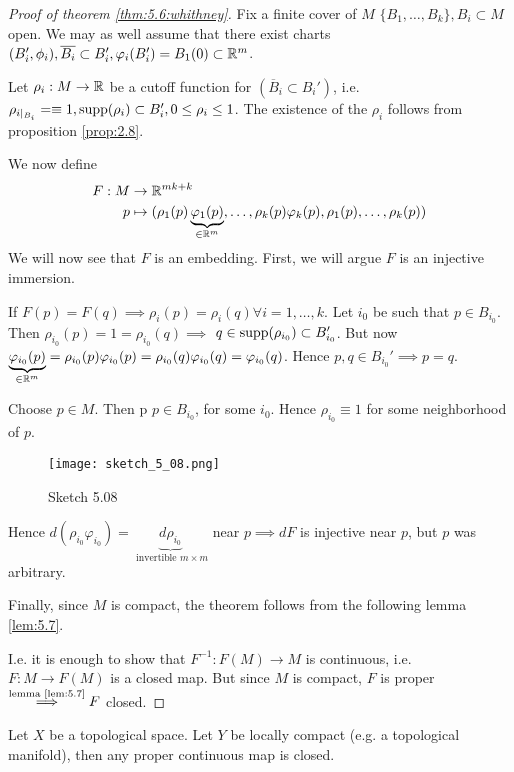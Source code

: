 \begin{proof}[Proof of theorem \ref{thm:5.6:whithney}]
    Fix a finite cover of \(M\) \(\{B_1,\dots,B_k\},B_i\subset M\) open. We may as well assume 
    that there exist charts \((B_i',\phi_i),\overline{B_i}\subset B_i',\varphi_i(B_i')=B_1(0)\subset \mathbb{R}^m\).

    Let \(\rho_i:M\to \mathbb{R}\) be a cutoff function for \((\overline{B}_i\subset B_i')\), i.e. \(\rho_{i\mid_{B_i}}=\equiv 1,\text{supp} (\rho_i)\subset B_i',0\leq \rho_i\leq 1\).
    The existence of the \(\rho_i\) follows from proposition \ref{prop:2.8}. 

    We now define 
    \begin{align*}
        F:M&\to \mathbb{R}^{mk+k}\\
        p&\mapsto (\rho_1(p)\underbrace{\varphi_1(p)}_{\in \mathbb{R}^m},\dots,\rho_k(p)\varphi_k(p),\rho_1(p),\dots,\rho_k(p))
    \end{align*}
    We will now see that \(F\) is an embedding. First, we will argue \(F\) is an injective immersion.

    If \(F(p)=F(q)\implies \rho_i(p)=\rho_i(q)\forall i=1,\dots,k\). Let \(i_0\) be such that \(p\in B_{i_0}\). Then 
    \(\rho_{i_0}(p)=1=\rho_{i_0}(q)\implies\) \(q\in \text{supp}(\rho_{i_0})\subset B_{i_0}'\). But 
    now \(\underbrace{\varphi_{i_0}(p)}_{\in\mathbb{R}^m} = \rho_{i_0}(p)\varphi_{i_0}(p)=\rho_{i_0}(q)\varphi_{i_0}(q)=\varphi_{i_0}(q)\). Hence \(p,q\in B_{i_0}'\implies p=q\).

     Choose \(p\in M\). Then p \(p\in B_{i_0}\), for some 
    \(i_0\). Hence \(\rho_{i_0}\equiv 1\) for some neighborhood of \(p\).
    \begin{figure}[H]\label{fig:5.08}
        \centering
        \texttt{[image: sketch\_5\_08.png]}
        \caption{Sketch 5.08}
    \end{figure}
    Hence \(d(\rho_{i_0}\varphi_{i_0})=\underbrace{d\rho_{i_0}}_{\text{ invertible }m\times m}\) near \(p\implies dF\) is injective near \(p\), but \(p\) was arbitrary.

    Finally,
    since \(M\) is compact, the theorem follows from the following lemma \ref{lem:5.7}.

    I.e. it is enough to show that \(F^{-1}:F(M)\to M\) is continuous, i.e. 
    \(F:M\to F(M)\) is a closed map. But since \(M\) is compact, \(F\) is proper \(\stackrel{\text{lemma \ref{lem:5.7}}}{\implies} F\) closed.

\end{proof}


\begin{lemma}\label{lem:5.7}
    Let \(X\) be a topological space. Let \(Y\) be locally compact (e.g. a topological manifold),
    then any proper continuous map %
    is closed.
\end{lemma}